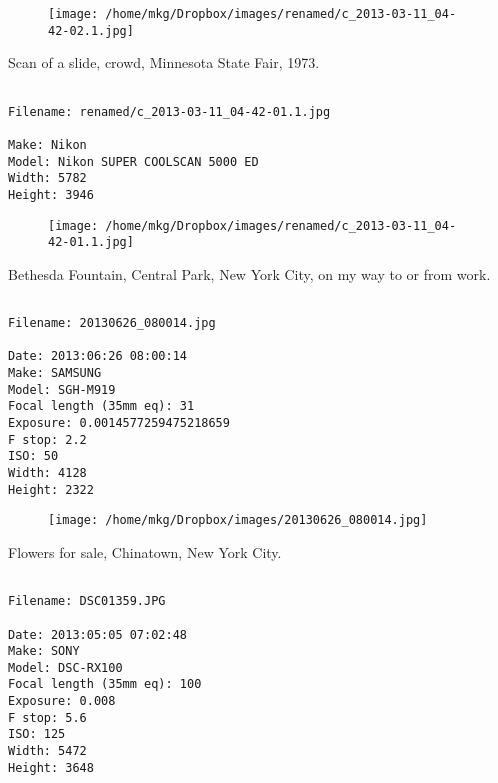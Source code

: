 \begin{figure}
\texttt{[image: /home/mkg/Dropbox/images/renamed/c\_2013-03-11\_04-42-02.1.jpg]}
\end{figure}
    
\clearpage
\onecolumn
\noindent Scan of a slide, crowd, Minnesota State Fair, 1973.
\noindent
\begin{lstlisting}

Filename: renamed/c_2013-03-11_04-42-01.1.jpg

Make: Nikon
Model: Nikon SUPER COOLSCAN 5000 ED
Width: 5782
Height: 3946
\end{lstlisting}
\clearpage

\begin{figure}
\texttt{[image: /home/mkg/Dropbox/images/renamed/c\_2013-03-11\_04-42-01.1.jpg]}
\end{figure}
    
\clearpage
\onecolumn
\noindent Bethesda Fountain, Central Park, New York City, on my way to or from work.
\noindent
\begin{lstlisting}

Filename: 20130626_080014.jpg

Date: 2013:06:26 08:00:14
Make: SAMSUNG
Model: SGH-M919
Focal length (35mm eq): 31
Exposure: 0.0014577259475218659
F stop: 2.2
ISO: 50
Width: 4128
Height: 2322
\end{lstlisting}
\clearpage

\begin{figure}
\texttt{[image: /home/mkg/Dropbox/images/20130626\_080014.jpg]}
\end{figure}
    
\clearpage
\onecolumn
\noindent Flowers for sale, Chinatown, New York City.
\noindent
\begin{lstlisting}

Filename: DSC01359.JPG

Date: 2013:05:05 07:02:48
Make: SONY
Model: DSC-RX100
Focal length (35mm eq): 100
Exposure: 0.008
F stop: 5.6
ISO: 125
Width: 5472
Height: 3648
\end{lstlisting}
\clearpage

